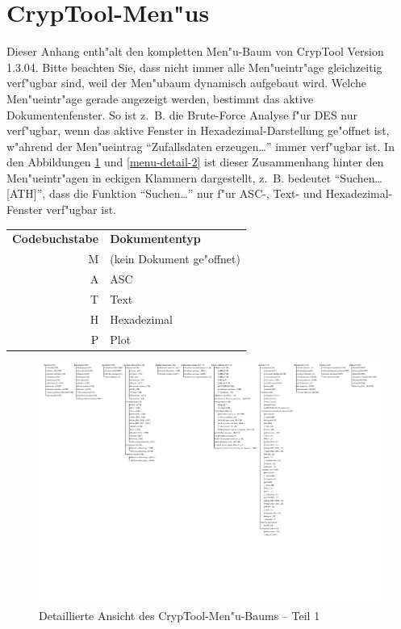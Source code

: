 
\enlargethispage{1cm}
\section{CrypTool-Men"us}
\hypertarget{appendix-menutree}{}\label{s:appendix-menutree}

Dieser Anhang enth"alt den kompletten Men"u-Baum von CrypTool Version 1.3.04.
Bitte beachten Sie, dass nicht immer alle Men"ueintr"age gleichzeitig
verf"ugbar sind, weil der Men"ubaum dynamisch aufgebaut wird. Welche
Men"ueintr"age gerade angezeigt werden, bestimmt das aktive Dokumentenfenster.
So ist z.~B.  die Brute-Force Analyse f"ur DES nur verf"ugbar, wenn das aktive
Fenster in Hexadezimal-Darstellung ge"offnet ist, w"ahrend der Men"ueintrag
"`Zufallsdaten erzeugen\dots"' immer verf"ugbar ist. In den Abbildungen
\ref{menu-detail-1} und \ref{menu-detail-2} ist dieser Zusammenhang hinter den
Men"ueintr"agen in eckigen Klammern dargestellt, z.~B. bedeutet
"`Suchen\dots[ATH]"', dass die Funktion "`Suchen\dots"' nur f"ur ASC-, Text-
und Hexadezimal-Fenster verf"ugbar ist.

\begin{center}
\begin{tabular}{rl}
\bf Codebuchstabe & \bf Dokumententyp \\
M & (kein Dokument ge"offnet)\\
A & ASC\\
T & Text\\
H & Hexadezimal\\
P & Plot\\
\end{tabular}
\end{center}

\nobreak

\begin{figure}[!hb]
\begin{center}
\includegraphics[scale=1.1, clip, viewport=10 340 426 600]{figures/cryptool-menu-detail-de}
\caption{Detaillierte Ansicht des CrypTool-Men"u-Baums -- Teil 1}
\label{menu-detail-1}
\end{center}
\end{figure}

